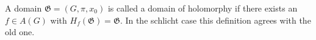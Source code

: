 A domain $\mathfrak{G} = (G, \pi, x_0)$ is called a domain of holomorphy if there exists an $f \in A(G)$ with $H_f(\mathfrak{G}) = \mathfrak{G}$. In the schlicht case this definition agrees with the old one.
